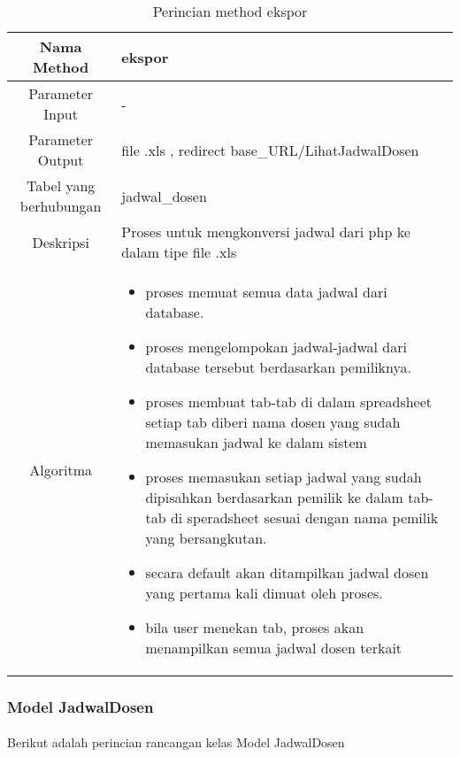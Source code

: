 \begin{center}
\begin{table}[H]
\begin{tabular}{|c|p{11cm}|}
\hline
Nama Method 	& 	ekspor 	\\
\hline
Parameter Input & - \\
\hline
Parameter Output & file .xls , redirect base\_URL/LihatJadwalDosen \\
\hline
Tabel yang berhubungan & jadwal\_dosen \\
\hline
Deskripsi	& Proses untuk mengkonversi jadwal dari php ke dalam tipe file .xls \\
\hline
Algoritma	& \begin{itemize}
				\item proses memuat semua data jadwal dari database.
				\item proses mengelompokan jadwal-jadwal dari database tersebut berdasarkan pemiliknya.
				\item proses membuat tab-tab di dalam spreadsheet setiap tab diberi nama dosen yang sudah memasukan jadwal ke dalam sistem
				\item proses memasukan setiap jadwal yang sudah dipisahkan berdasarkan pemilik ke dalam tab-tab di speradsheet sesuai dengan nama pemilik yang bersangkutan.
				\item secara default akan ditampilkan jadwal dosen yang pertama kali dimuat oleh proses.
				\item bila user menekan tab, proses akan menampilkan semua jadwal dosen terkait
				\end{itemize} \\
\hline
\end{tabular}
\caption{Perincian method ekspor}
\end{table}
\end{center}


\subsubsection{Model JadwalDosen}
\paragraph{} Berikut adalah perincian rancangan kelas Model JadwalDosen


